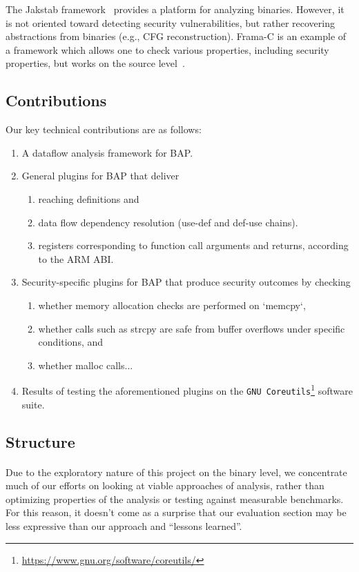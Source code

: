 \documentclass[letterpaper,11pt]{article}
\begin{document}
The Jakstab framework~\cite{kinder2008jakstab} provides a platform for
analyzing binaries. However, it is not oriented toward detecting security
vulnerabilities, but rather recovering abstractions from binaries (e.g.,
CFG reconstruction). Frama-C is an example of a framework which
allows one to check various properties, including security properties,
but works on the source level~\cite{cuoq2012frama}.

\subsection{Contributions}

Our key technical contributions are as follows:

\begin{enumerate}
  \item A dataflow analysis framework for BAP.
  \item General plugins for BAP that deliver
    \begin{enumerate}
      \item reaching definitions and
      \item data flow dependency resolution (use-def and def-use chains).
      \item registers corresponding to function call arguments and returns,
            according to the ARM ABI.
    \end{enumerate}
  \item Security-specific plugins for BAP that produce security outcomes by checking
    \begin{enumerate}
      \item whether memory allocation checks are performed on `memcpy`,
      \item whether calls such as strcpy are safe from buffer overflows under
        specific conditions, and
      \item whether malloc calls... %
    \end{enumerate}
  \item Results of testing the aforementioned plugins on the \texttt{GNU Coreutils}\footnote{\url{https://www.gnu.org/software/coreutils/}}
    software suite.
\end{enumerate}

\subsection{Structure}

\paragraph{}
Due to the exploratory nature of this project on the binary level, we
concentrate much of our efforts on looking at viable approaches of analysis,
rather than optimizing properties of the analysis or testing against measurable
benchmarks. For this reason, it doesn't come as a surprise that our evaluation
section may be less expressive than our approach and ``lessons learned''.
\end{document}
